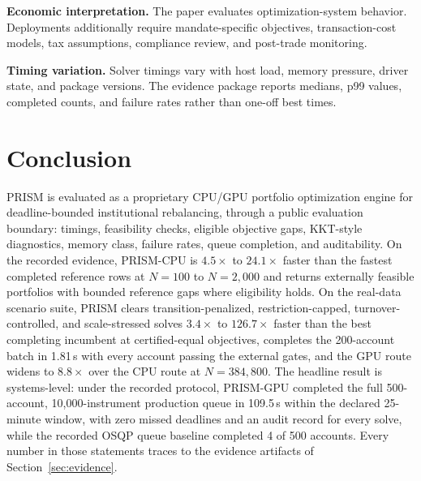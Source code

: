 \documentclass[10pt,a4paper]{extarticle}
\begin{document}
\textbf{Economic interpretation.} The paper evaluates optimization-system
behavior. Deployments additionally require mandate-specific objectives,
transaction-cost models, tax assumptions, compliance review, and post-trade
monitoring.

\textbf{Timing variation.} Solver timings vary with host load, memory
pressure, driver state, and package versions. The evidence package reports
medians, p99 values, completed counts, and failure rates rather than one-off
best times.

\section{Conclusion}
\label{sec:conclusion}

PRISM is evaluated as a proprietary CPU/GPU portfolio optimization engine for
deadline-bounded institutional rebalancing, through a public evaluation
boundary: timings, feasibility checks, eligible objective gaps, KKT-style
diagnostics, memory class, failure rates, queue completion, and auditability.
On the recorded evidence, PRISM-CPU is $4.5\times$ to $24.1\times$ faster than
the fastest completed reference rows at $N{=}100$ to $N{=}2{,}000$ and returns
externally feasible portfolios with bounded reference gaps where eligibility
holds. On the real-data scenario suite, PRISM clears transition-penalized,
restriction-capped, turnover-controlled, and scale-stressed solves
$3.4\times$ to $126.7\times$ faster than the best completing incumbent at
certified-equal objectives, completes the 200-account batch in 1.81\,s with
every account passing the external gates, and the GPU route widens to
$8.8\times$ over the CPU route at $N{=}384{,}800$. The headline result is systems-level:
under the recorded protocol, PRISM-GPU completed the full 500-account,
10,000-instrument production queue in 109.5\,s within the declared 25-minute
window, with zero missed deadlines and an audit record for every solve, while
the recorded OSQP queue baseline completed 4 of 500 accounts. Every number in
those statements traces to the evidence artifacts of
Section~\ref{sec:evidence}.



\end{document}
